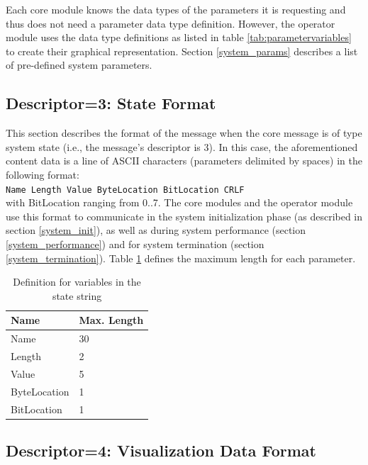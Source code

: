 \documentclass[letterpaper,oneside,12pt]{book}
\newcommand{\todo}[1]{}
\begin{document}
Each core module knows the data types of the parameters it is requesting and 
thus does not need a parameter data type definition. However, the operator 
module uses the data type definitions as listed in table 
\ref{tab:parametervariables} to create their graphical representation. Section 
\ref{system_params} describes a list of pre-defined system parameters.

\todo{Describe proposal for parameter data type for state definition, e.g.,
TargetCode 1 Feedback 1}

\subsection{Descriptor=3: State Format}
\label{state_format}

This section describes the format of the message when the core message is of 
type system state (i.e., the message's descriptor is 3). In this case, the 
aforementioned content data is a line of ASCII characters (parameters
delimited by spaces) in the following format:
\\[2ex]
\verb|Name Length Value ByteLocation BitLocation CRLF|
\\[2ex]
with BitLocation ranging from 0..7.
The core modules and the operator module use this format to communicate in 
the system initialization phase (as described in section \ref{system_init}), 
as well as during system performance (section \ref{system_performance}) and 
for system termination (section \ref{system_termination}). Table 
\ref{state_table} defines the maximum length for each parameter.

\begin{table}[ht]
 \centering
 \begin{tabular}{|l|l|}
  \hline
  \textbf{Name} & \textbf{Max. Length} \\
  \hline
  Name & 30 \\
  \hline
  Length & 2 \\
  \hline
  Value & 5 \\
  \hline
  ByteLocation & 1 \\
  \hline
  BitLocation & 1 \\
  \hline
 \end{tabular}
 \caption{Definition for variables in the state string}
 \label{state_table}
\end{table}   

\subsection{Descriptor=4: Visualization Data Format}
\label{visualizationdata_format}
\end{document}

